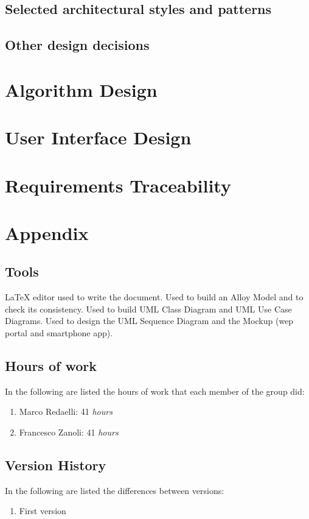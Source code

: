 \documentclass{../Common/Structure/doc_pdf}
\begin{document}
\section{Selected architectural styles and patterns}
\section{Other design decisions}

\chapter{Algorithm Design}
\chapter{User Interface Design}
\chapter{Requirements Traceability}

\appendix
\chapter{Appendix}

\section{Tools}
\begin{itemize}
	 \LaTeX{} editor used to write the document.
	 Used to build an Alloy Model and to check its consistency.
	 Used to build UML Class Diagram and UML Use Case Diagrams.
	 Used to design the UML Sequence Diagram and the Mockup (wep portal and smartphone app).
\end{itemize}
\newpage
\section{Hours of work}
In the following are listed the hours of work that each member of the group did:
\begin{enumerate}
	\item Marco Redaelli: 41 \emph{hours}
	\item Francesco Zanoli: 41 \emph{hours}
\end{enumerate}
\newpage
\section{Version History}
In the following are listed the differences between versions:
\begin{enumerate}
	\item First version
\end{enumerate}
\end{document}
